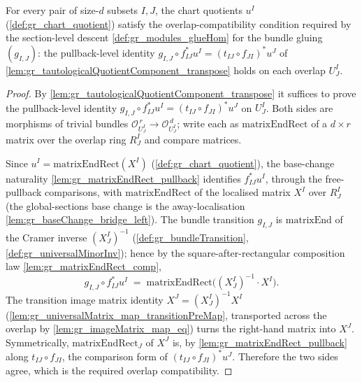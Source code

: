 \begin{lemma}


  \label{lem:gr_tautologicalQuotient_overlap}
  For every pair of size-\(d\) subsets \(I, J\), the chart quotients \(u^I\)
  (\cref{def:gr_chart_quotient}) satisfy the overlap-compatibility condition required by the
  section-level descent \cref{def:gr_modules_glueHom} for the bundle gluing \((g_{I,J})\):
  the pullback-level identity \(g_{I,J} \circ f_{IJ}^{*} u^I = (t_{IJ}\circ f_{JI})^{*} u^J\)
  of \cref{lem:gr_tautologicalQuotientComponent_transpose} holds on each overlap \(U^I_J\).
\end{lemma}
\begin{proof}
    \leanok
  By \cref{lem:gr_tautologicalQuotientComponent_transpose} it suffices to prove the
  pullback-level identity \(g_{I,J} \circ f_{IJ}^{*} u^I = (t_{IJ}\circ f_{JI})^{*} u^J\) on
  \(U^I_J\). Both sides are morphisms of trivial bundles \(\mathcal{O}_{U^I_J}^{\,r} \to
  \mathcal{O}_{U^I_J}^{\,d}\); write each as \(\mathrm{matrixEndRect}\) of a \(d \times r\)
  matrix over the overlap ring \(R^I_J\) and compare matrices.

  Since \(u^I = \mathrm{matrixEndRect}(X^I)\) (\cref{def:gr_chart_quotient}), the
  base-change naturality \cref{lem:gr_matrixEndRect_pullback} identifies \(f_{IJ}^{*} u^I\),
  through the free-pullback comparisons, with \(\mathrm{matrixEndRect}\) of the localised
  matrix \(X^I\) over \(R^I_J\) (the global-sections base change is the away-localisation
  \cref{lem:gr_baseChange_bridge_left}). The bundle transition \(g_{I,J}\) is
  \(\mathrm{matrixEnd}\) of the Cramer inverse \((X^I_J)^{-1}\)
  (\cref{def:gr_bundleTransition}, \cref{def:gr_universalMinorInv}); hence by the
  square-after-rectangular composition law \cref{lem:gr_matrixEndRect_comp},
  \[
    g_{I,J} \circ f_{IJ}^{*} u^I
      \;=\; \mathrm{matrixEndRect}\bigl((X^I_J)^{-1} \cdot X^I\bigr).
  \]
  The transition image matrix identity \(X^J = (X^I_J)^{-1} X^I\)
  (\cref{lem:gr_universalMatrix_map_transitionPreMap}, transported across the overlap by
  \cref{lem:gr_imageMatrix_map_eq}) turns the right-hand matrix into \(X^J\). Symmetrically,
  \(\mathrm{matrixEndRect}_J\) of \(X^J\) is, by \cref{lem:gr_matrixEndRect_pullback} along
  \(t_{IJ}\circ f_{JI}\), the comparison form of \((t_{IJ}\circ f_{JI})^{*} u^J\). Therefore
  the two sides agree, which is the required overlap compatibility.
\end{proof}

